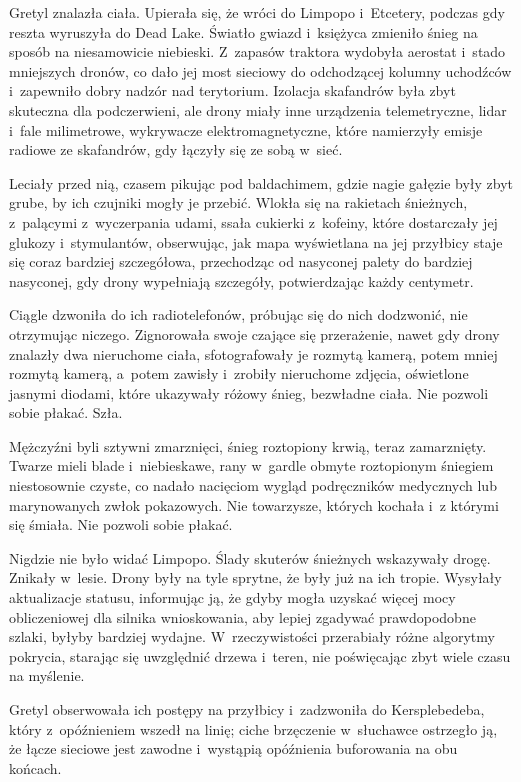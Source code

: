 \documentclass[oneside,polish,11pt,sfheadings]{mwbk}
\begin{document}
Gretyl znalazła ciała. Upierała się, że wróci do Limpopo i~Etcetery,
podczas gdy reszta wyruszyła do Dead Lake. Światło gwiazd i~księżyca
zmieniło śnieg na sposób na niesamowicie niebieski. Z~zapasów traktora
wydobyła aerostat i~stado mniejszych dronów, co dało jej most sieciowy
do odchodzącej kolumny uchodźców i~zapewniło dobry nadzór nad
terytorium. Izolacja skafandrów była zbyt skuteczna dla podczerwieni,
ale drony miały inne urządzenia telemetryczne, lidar i~fale milimetrowe,
wykrywacze elektromagnetyczne, które namierzyły emisje radiowe ze
skafandrów, gdy łączyły się ze sobą w~sieć.

Leciały przed nią, czasem pikując pod baldachimem, gdzie nagie gałęzie
były zbyt grube, by ich czujniki mogły je przebić. Wlokła się na
rakietach śnieżnych, z~palącymi z~wyczerpania udami, ssała cukierki z~kofeiny, które dostarczały jej glukozy i~stymulantów, obserwując, jak
mapa wyświetlana na jej przyłbicy staje się coraz bardziej szczegółowa,
przechodząc od nasyconej palety do bardziej nasyconej, gdy drony
wypełniają szczegóły, potwierdzając każdy centymetr.

Ciągle dzwoniła do ich radiotelefonów, próbując się do nich dodzwonić,
nie otrzymując niczego. Zignorowała swoje czające się przerażenie, nawet
gdy drony znalazły dwa nieruchome ciała, sfotografowały je rozmytą
kamerą, potem mniej rozmytą kamerą, a~potem zawisły i~zrobiły nieruchome
zdjęcia, oświetlone jasnymi diodami, które ukazywały różowy śnieg,
bezwładne ciała. Nie pozwoli sobie płakać. Szła.

Mężczyźni byli sztywni zmarznięci, śnieg roztopiony krwią, teraz
zamarznięty. Twarze mieli blade i~niebieskawe, rany w~gardle obmyte
roztopionym śniegiem niestosownie czyste, co nadało nacięciom wygląd
podręczników medycznych lub marynowanych zwłok pokazowych. Nie
towarzysze, których kochała i~z którymi się śmiała. Nie pozwoli sobie
płakać.

Nigdzie nie było widać Limpopo. Ślady skuterów śnieżnych wskazywały
drogę. Znikały w~lesie. Drony były na tyle sprytne, że były już na ich
tropie. Wysyłały aktualizacje statusu, informując ją, że gdyby mogła
uzyskać więcej mocy obliczeniowej dla silnika wnioskowania, aby lepiej
zgadywać prawdopodobne szlaki, byłyby bardziej wydajne. W~rzeczywistości
przerabiały różne algorytmy pokrycia, starając się uwzględnić drzewa i~teren, nie poświęcając zbyt wiele czasu na myślenie.

Gretyl obserwowała ich postępy na przyłbicy i~zadzwoniła do
Kersplebedeba, który z~opóźnieniem wszedł na linię; ciche brzęczenie w~słuchawce ostrzegło ją, że łącze sieciowe jest zawodne i~wystąpią
opóźnienia buforowania na obu końcach.
\end{document}
